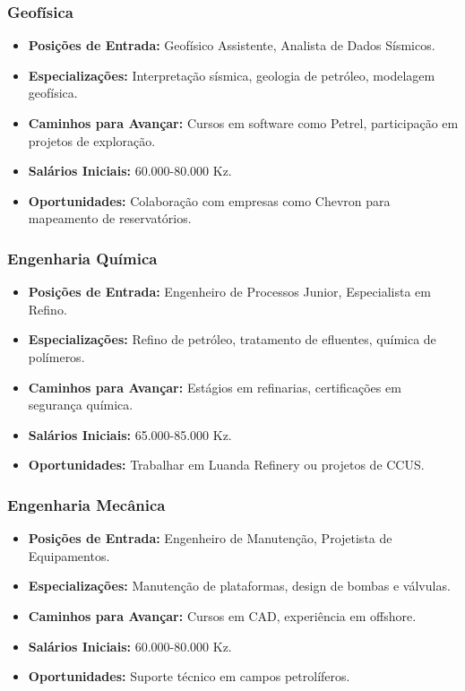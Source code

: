 \documentclass[12pt]{article}
\begin{document}
\subsubsection{Geofísica}
\begin{itemize}
    \item \textbf{Posições de Entrada:} Geofísico Assistente, Analista de Dados Sísmicos.
    \item \textbf{Especializações:} Interpretação sísmica, geologia de petróleo, modelagem geofísica.
    \item \textbf{Caminhos para Avançar:} Cursos em software como Petrel, participação em projetos de exploração.
    \item \textbf{Salários Iniciais:} 60.000-80.000 Kz.
    \item \textbf{Oportunidades:} Colaboração com empresas como Chevron para mapeamento de reservatórios.
\end{itemize}

\subsubsection{Engenharia Química}
\begin{itemize}
    \item \textbf{Posições de Entrada:} Engenheiro de Processos Junior, Especialista em Refino.
    \item \textbf{Especializações:} Refino de petróleo, tratamento de efluentes, química de polímeros.
    \item \textbf{Caminhos para Avançar:} Estágios em refinarias, certificações em segurança química.
    \item \textbf{Salários Iniciais:} 65.000-85.000 Kz.
    \item \textbf{Oportunidades:} Trabalhar em Luanda Refinery ou projetos de CCUS.
\end{itemize}

\subsubsection{Engenharia Mecânica}
\begin{itemize}
    \item \textbf{Posições de Entrada:} Engenheiro de Manutenção, Projetista de Equipamentos.
    \item \textbf{Especializações:} Manutenção de plataformas, design de bombas e válvulas.
    \item \textbf{Caminhos para Avançar:} Cursos em CAD, experiência em offshore.
    \item \textbf{Salários Iniciais:} 60.000-80.000 Kz.
    \item \textbf{Oportunidades:} Suporte técnico em campos petrolíferos.
\end{itemize}
\end{document}
